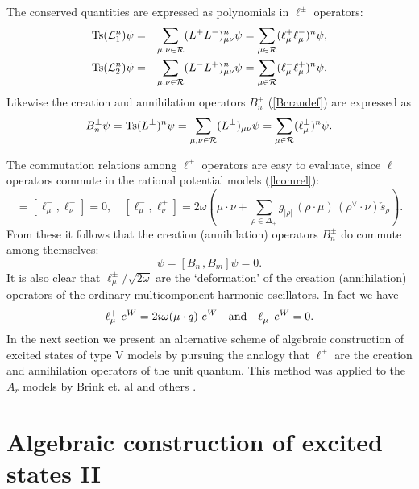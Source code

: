\documentclass[a4paper,12pt]{article}
\begin{document}
The conserved quantities are expressed as polynomials in \(\ell^{\pm}\)
operators:
\begin{eqnarray}
   \mbox{Ts}({\cal L}_1^n)\psi&=&\sum_{\mu,\nu\in{\cal
   R}}(L^+L^-)^n_{\mu\nu}\psi=
   \sum_{\mu\in{\cal R}}(\ell_{\mu}^+\ell_{\mu}^-)^n\psi,
   \label{lpmcons}\\
   \mbox{Ts}({\cal L}_2^n)\psi&=&\sum_{\mu,\nu\in{\cal
   R}}(L^-L^+)^n_{\mu\nu}\psi=
   \sum_{\mu\in{\cal R}}(\ell_{\mu}^-\ell_{\mu}^+)^n\psi.
   \nonumber
\end{eqnarray}
Likewise the creation and annihilation operators \(B_n^\pm\)
 (\ref{Bcrandef})
are expressed as
\begin{equation}
   B_n^\pm\psi=\mbox{Ts}(L^{\pm})^n\psi=\sum_{\mu,\nu\in{\cal
   R}}(L^\pm)_{\mu\nu}\psi=
   \sum_{\mu\in{\cal R}}(\ell_{\mu}^\pm)^n\psi.
\end{equation}


The commutation relations among \(\ell^\pm\) operators
are easy to evaluate, since
 \(\ell\) operators commute in the rational potential models
(\ref{lcomrel}):
\begin{equation}
   [\ell_{\mu}^+,\ell_{\nu}^+]=[\ell_{\mu}^-,\ell_{\nu}^-]=0,\quad
   [\ell^-_{\mu},\ell^+_{\nu}]=2\omega\left(\mu\cdot\nu+
   \sum_{\rho\in\Delta_{+}}g_{|\rho|}
   \,(\rho\cdot\mu)\,(\rho^\vee\!\cdot\nu)\check{s}_{\rho}\right).
   \label{llcomm}
\end{equation}
\noindent From these it follows that the creation (annihilation) operators
\(B_n^\pm\) do commute among themselves:
\begin{equation}
   [B_n^+,B_m^+]\psi=[B_n^-,B_m^-]\psi=0.
   \label{cccommu}
\end{equation}
It is also clear that \(\ell_\mu^\pm{/\sqrt{2\omega}}\)
are the `deformation' of the creation (annihilation) operators of  the
ordinary multicomponent harmonic oscillators. In fact we have
\begin{equation}
   \ell_\mu^+~e^{W}=2i\omega(\mu\cdot q)~e^W \quad{\rm
   and}\quad \ell_\mu^-~e^{W}=0.
\end{equation}
In the next section we present an alternative scheme of algebraic
construction of excited states of type V models by pursuing the analogy that
\(\ell^\pm\) are the creation and annihilation operators of the unit
quantum.
This method was applied to the \(A_r\) models by Brink et. al and others
\cite{Br,Pol,UjWa}.


\section{Algebraic construction of excited states II}
\label{alconst2}
\setcounter{equation}{0}
\end{document}
